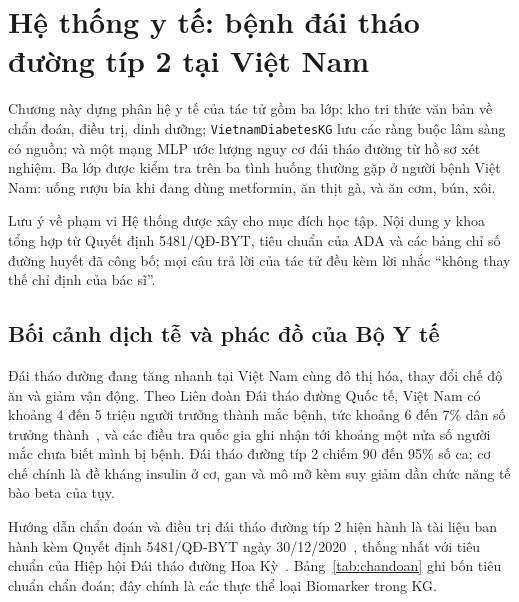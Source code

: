 \chapter{Hệ thống y tế: bệnh đái tháo đường típ 2 tại Việt Nam}\label{chap:yte}

Chương này dựng phân hệ y tế của tác tử gồm ba lớp: kho tri thức văn bản về chẩn đoán, điều trị, dinh dưỡng;
\texttt{VietnamDiabetesKG} lưu các ràng buộc lâm sàng có nguồn; và một mạng MLP ước lượng nguy cơ đái tháo đường
từ hồ sơ xét nghiệm. Ba lớp được kiểm tra trên ba tình huống thường gặp ở người bệnh Việt Nam: uống rượu bia
khi đang dùng metformin, ăn thịt gà, và ăn cơm, bún, xôi.

\begin{phathien}{Lưu ý về phạm vi}
Hệ thống được xây cho mục đích học tập. Nội dung y khoa tổng hợp từ Quyết định 5481/QĐ-BYT, tiêu chuẩn của ADA và
các bảng chỉ số đường huyết đã công bố; mọi câu trả lời của tác tử đều kèm lời nhắc ``không thay thế chỉ định của
bác sĩ''.
\end{phathien}

\section{Bối cảnh dịch tễ và phác đồ của Bộ Y tế}
Đái tháo đường đang tăng nhanh tại Việt Nam cùng đô thị hóa, thay đổi chế độ ăn và giảm vận động. Theo Liên đoàn
Đái tháo đường Quốc tế, Việt Nam có khoảng 4 đến 5 triệu người trưởng thành mắc bệnh, tức khoảng 6 đến 7\% dân số
trưởng thành~\cite{idf2021atlas}, và các điều tra quốc gia ghi nhận tới khoảng một nửa số người mắc chưa biết mình
bị bệnh. Đái tháo đường típ 2 chiếm 90 đến 95\% số ca; cơ chế chính là đề kháng insulin ở cơ, gan và mô mỡ kèm suy
giảm dần chức năng tế bào beta của tụy.

Hướng dẫn chẩn đoán và điều trị đái tháo đường típ 2 hiện hành là tài liệu ban hành kèm Quyết định 5481/QĐ-BYT ngày
30/12/2020~\cite{byt5481}, thống nhất với tiêu chuẩn của Hiệp hội Đái tháo đường Hoa Kỳ~\cite{ada2024standards}.
Bảng~\ref{tab:chandoan} ghi bốn tiêu chuẩn chẩn đoán; đây chính là các thực thể loại \textsf{Biomarker} trong KG.

